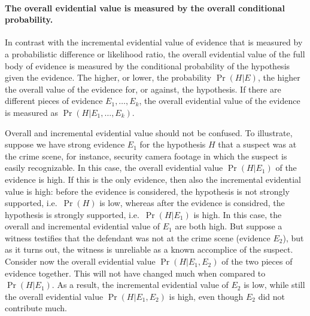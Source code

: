 \documentclass[10pt]{article}
\begin{document}


\paragraph{The overall evidential value is measured by the overall conditional probability. }

In contrast with the incremental evidential value of evidence that is measured by a probabilistic difference or likelihood ratio, the overall evidential value of the full body of evidence is measured by the conditional probability of the hypothesis given the evidence. The higher, or lower, the probability $\Pr(H|E)$, the higher 
the overall value of the evidence for, or against, the hypothesis. If there are different pieces of evidence $E_1, \ldots, E_k$, 
the overall evidential value of the evidence is measured as $\Pr(H|E_1, \ldots, E_k)$.

Overall and incremental evidential value should not be confused. To illustrate, suppose we have strong evidence $E_1$ for the hypothesis $H$ 
that a suspect was at the crime scene, for instance, security camera footage in which the suspect is easily recognizable. 
In this case, the overall evidential value $\Pr(H|E_1)$ of the evidence is high. If this is the only evidence, then also the 
incremental evidential value is high: before the evidence is considered, the hypothesis is not strongly supported, i.e.\ $\Pr(H)$ is low, whereas after the evidence is considred, 
the hypothesis is strongly supported, i.e.\ $\Pr(H|E_1)$ is high. In this case, the overall and incremental evidential value of $E_1$ are both high. 
But suppose a witness testifies that the defendant was not at the crime scene (evidence $E_2$), but as it turns out, the witness is unreliable 
as a known accomplice of the suspect. Consider now the overall evidential value $\Pr(H|E_1, E_2)$ of the two pieces of evidence together. This will not have changed much when compared to $\Pr(H|E_1)$. As a result, the incremental evidential value of $E_2$ is low, while still the overall evidential value $\Pr(H|E_1, E_2)$ is high, even though $E_2$ did not contribute much. 
\end{document}
